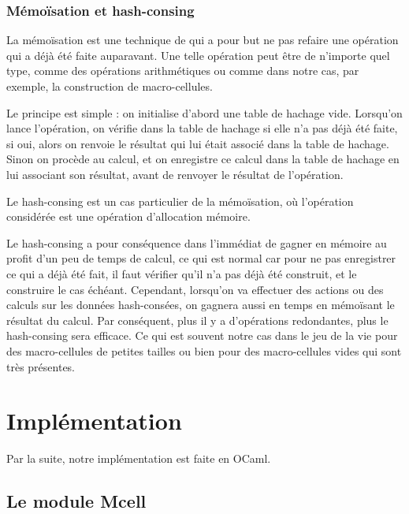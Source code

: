 \documentclass[a4paper,12pt]{report}
\begin{document}
\subsection*{Mémoïsation et hash-consing}\label{section:hashconsig}

La mémoïsation est une technique de qui a pour but ne pas refaire une
opération qui a déjà été faite auparavant. Une telle opération peut être
de n'importe quel type, comme des opérations arithmétiques ou comme
dans notre cas, par exemple, la construction de macro-cellules.

Le principe est simple : on initialise d'abord une table de hachage
vide. Lorsqu'on lance l'opération, on vérifie dans la table de
hachage si elle n'a pas déjà été faite, si oui, alors on renvoie le
résultat qui lui était associé dans la table de hachage. Sinon on
procède au calcul, et on enregistre ce calcul dans la table de hachage
en lui associant son résultat, avant de renvoyer le résultat de
l'opération.

Le hash-consing est un cas particulier de la mémoïsation, où l'opération
considérée est une opération d'allocation mémoire.

Le hash-consing a pour conséquence dans l'immédiat de gagner en mémoire au
profit d'un peu de temps de calcul, ce qui est normal car pour ne pas
enregistrer ce qui a déjà été fait, il faut vérifier qu'il n'a pas déjà été
construit, et le construire le cas échéant.  Cependant, lorsqu'on va effectuer
des actions ou des calculs sur les données hash-consées, on gagnera aussi en
temps en mémoïsant le résultat du calcul. Par conséquent, plus il y a
d'opérations redondantes, plus le hash-consing sera efficace.  Ce qui est
souvent notre cas dans le jeu de la vie pour des macro-cellules de petites
tailles ou bien pour des macro-cellules vides qui sont très présentes.












\chapter{Implémentation}\label{chap:implement}

Par la suite, notre implémentation est faite en OCaml.

\section{Le module Mcell}\label{section:mcell}
\end{document}
